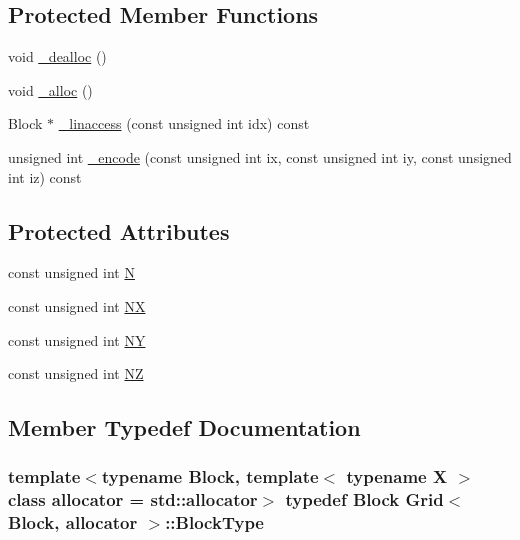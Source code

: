\subsection*{Protected Member Functions}
\begin{DoxyCompactItemize}
\item 
void \hyperlink{class_grid_a3b8f802b38cc4ce4bbd5d2ea9e13f5a3}{\+\_\+dealloc} ()
\item 
void \hyperlink{class_grid_a0d207eb76e069627ebe75c464da7b07a}{\+\_\+alloc} ()
\item 
Block $\ast$ \hyperlink{class_grid_a40a45d5ba147af8742dbe542d36064c4}{\+\_\+linaccess} (const unsigned int idx) const 
\item 
unsigned int \hyperlink{class_grid_aefd1612f9fe87762a3200a10258fe77b}{\+\_\+encode} (const unsigned int ix, const unsigned int iy, const unsigned int iz) const 
\end{DoxyCompactItemize}
\subsection*{Protected Attributes}
\begin{DoxyCompactItemize}
\item 
const unsigned int \hyperlink{class_grid_a9ec3e376ce1de3c9e056a7ccebb34d42}{N}
\item 
const unsigned int \hyperlink{class_grid_a5253120e941ec878f57dd17d5f54cadd}{N\+X}
\item 
const unsigned int \hyperlink{class_grid_a8956891d20426acabca4252ec7e299bc}{N\+Y}
\item 
const unsigned int \hyperlink{class_grid_ad6632ff47c714e008ba88a89b4c1684b}{N\+Z}
\end{DoxyCompactItemize}


\subsection{Member Typedef Documentation}
\hypertarget{class_grid_a455d62a62799b947e799a28315700b9e}{}
\subsubsection[{Block\+Type}]{\setlength{\rightskip}{0pt plus 5cm}template$<$typename Block, template$<$ typename X $>$ class allocator = std\+::allocator$>$ typedef Block {\bf Grid}$<$ Block, allocator $>$\+::{\bf Block\+Type}}\label{class_grid_a455d62a62799b947e799a28315700b9e}


